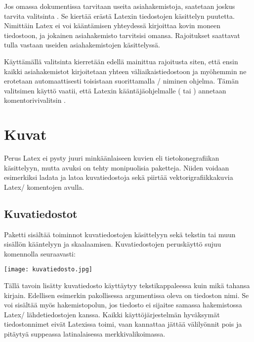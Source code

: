 \begin{koodilohkosis}
\usepackage[xindy]{indextools}
\end{koodilohkosis}

\noindent
Jos omassa dokumentissa tarvitaan useita asiahakemistoja, saatetaan
joskus tarvita valitsinta . Se kiertää erästä Latexin
tiedostojen käsittelyn puutetta. Nimittäin Latex ei voi kääntämisen
yhteydessä kirjoittaa kovin moneen tiedostoon, ja jokainen asiahakemisto
tarvitsisi omansa. Rajoitukset saattavat tulla vastaan useiden
asiahakemistojen käsittelyssä.

Käyttämällä valitsinta  kierretään edellä mainittua
rajoitusta siten, että ensin kaikki asiahakemistot kirjoitetaan yhteen
väliaikaistiedostoon ja myöhemmin ne erotetaan automaattisesti
toisistaan suorittamalla \-/ niminen ohjelma. Tämän
valitsimen käyttö vaatii, että Latexin kääntäjäohjelmalle
( tai ) annetaan komentorivivalitsin
.

\section{Kuvat}
\label{luku/grafiikka}

Perus Latex ei pysty juuri minkäänlaiseen kuvien eli tietokonegrafiikan
käsittelyyn, mutta avuksi on tehty monipuolisia paketteja. Niiden
voidaan esimerkiksi ladata ja latoa kuvatiedostoja sekä piirtää
vektorigrafiikkakuvia Latex\-/ komentojen avulla.

\subsection{Kuvatiedostot}

Paketti  sisältää toiminnot kuvatiedostojen
käsittelyyn sekä tekstin tai muun sisällön kääntelyyn ja skaalaamisen.
Kuvatiedostojen peruskäyttö sujuu komennolla 
seuraavasti:

\begin{koodilohkosis}
\texttt{[image: kuvatiedosto.jpg]}
\end{koodilohkosis}

\noindent
Tällä tavoin lisätty kuvatiedosto käyttäytyy tekstikappaleessa kuin mikä
tahansa kirjain. Edellisen esimerkin pakollisessa argumentissa oleva
 on tiedoston nimi. Se voi sisältää myös
hakemistopolun, jos tiedosto ei sijaitse samassa hakemistossa Latex\-/
lähdetiedostojen kanssa. Kaikki käyttöjärjestelmän hyväksymät
tiedostonnimet eivät Latexissa toimi, vaan kannattaa jättää välilyönnit
pois ja pitäytyä suppeassa latinalaisessa merkkivalikoimassa.

